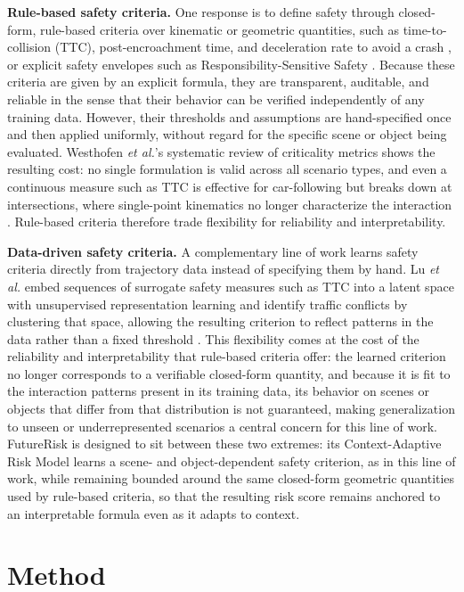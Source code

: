 \documentclass[letterpaper, 10 pt, conference]{ieeeconf}  %
\begin{document}
\textbf{Rule-based safety criteria.} One response is to define safety through closed-form, rule-based criteria over kinematic or geometric quantities, such as time-to-collision (TTC), post-encroachment time, and deceleration rate to avoid a crash \cite{arun2021systematic, wang2021review}, or explicit safety envelopes such as Responsibility-Sensitive Safety \cite{shalevshwartz2017rss}. Because these criteria are given by an explicit formula, they are transparent, auditable, and reliable in the sense that their behavior can be verified independently of any training data. However, their thresholds and assumptions are hand-specified once and then applied uniformly, without regard for the specific scene or object being evaluated. Westhofen \emph{et al.}'s systematic review of criticality metrics shows the resulting cost: no single formulation is valid across all scenario types, and even a continuous measure such as TTC is effective for car-following but breaks down at intersections, where single-point kinematics no longer characterize the interaction \cite{westhofen2023criticality}. Rule-based criteria therefore trade flexibility for reliability and interpretability.

\textbf{Data-driven safety criteria.} A complementary line of work learns safety criteria directly from trajectory data instead of specifying them by hand. Lu \emph{et al.} embed sequences of surrogate safety measures such as TTC into a latent space with unsupervised representation learning and identify traffic conflicts by clustering that space, allowing the resulting criterion to reflect patterns in the data rather than a fixed threshold \cite{lu2022learning}. This flexibility comes at the cost of the reliability and interpretability that rule-based criteria offer: the learned criterion no longer corresponds to a verifiable closed-form quantity, and because it is fit to the interaction patterns present in its training data, its behavior on scenes or objects that differ from that distribution is not guaranteed, making generalization to unseen or underrepresented scenarios a central concern for this line of work. FutureRisk is designed to sit between these two extremes: its Context-Adaptive Risk Model learns a scene- and object-dependent safety criterion, as in this line of work, while remaining bounded around the same closed-form geometric quantities used by rule-based criteria, so that the resulting risk score remains anchored to an interpretable formula even as it adapts to context.

\section{Method}
\label{sec:method}
\end{document}
